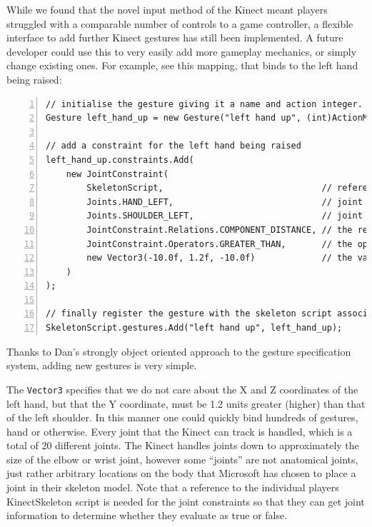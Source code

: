 \documentclass[a4paper,oneside]{memoir}
\begin{document}
			While we found that the novel input method of the Kinect meant players struggled with a comparable number of controls to a game controller, a flexible interface to add further Kinect gestures has still been implemented.
			A future developer could use this to very easily add more gameplay mechanics, or simply change existing ones. 
			For example, see this mapping, that binds to the left hand being raised:

			\begin{lstlisting}[language=CSharp,numbers=left,morekeywords={Joints,JointConstraint,Gesture}]
// initialise the gesture giving it a name and action integer.
Gesture left_hand_up = new Gesture("left hand up", (int)ActionManager.actions.handUp);

// add a constraint for the left hand being raised
left_hand_up.constraints.Add(
	new JointConstraint(
		SkeletonScript,                               // reference to the assigned skeleton script
		Joints.HAND_LEFT,                             // joint a
		Joints.SHOULDER_LEFT,                         // joint b
		JointConstraint.Relations.COMPONENT_DISTANCE, // the relation
		JointConstraint.Operators.GREATER_THAN,       // the operator
		new Vector3(-10.0f, 1.2f, -10.0f)             // the value (three-tuple)
	)
);

// finally register the gesture with the skeleton script associated with the player.
SkeletonScript.gestures.Add("left hand up", left_hand_up);
			\end{lstlisting}

			Thanks to Dan's strongly object oriented approach to the gesture specification system, adding new gestures is very simple.

			The \texttt{Vector3} specifies that we do not care about the X and Z coordinates of the left hand, but that the Y coordinate, must be 1.2 units greater (higher) than that of the left shoulder.
			In this manner one could quickly bind hundreds of gestures, hand or otherwise.
			Every joint that the Kinect can track is handled, which is a total of 20 different joints. The Kinect handles joints down to approximately the size of the elbow or wrist joint, however some ``joints'' are not anatomical joints, just rather arbitrary locations on the body that Microsoft has chosen to place a joint in their skeleton model.
			Note that a reference to the individual players KinectSkeleton script is needed for the joint constraints so that they can get joint information to determine whether they evaluate as true or false.
\end{document}

